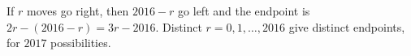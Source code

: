 If $r$ moves go right, then $2016-r$ go left and the endpoint is $2r-(2016-r)=3r-2016$. Distinct $r=0,1,\ldots,2016$ give distinct endpoints, for $\boxed{2017}$ possibilities.
